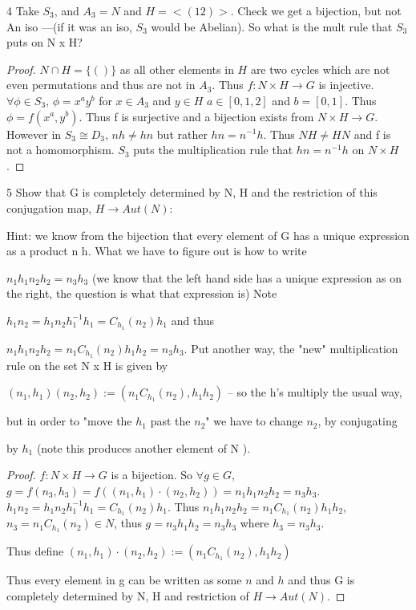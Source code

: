 \documentclass{article}
\begin{document}
\bigskip

\begin{PROB}{4}\label{Problem 4.}
    Take $S_3$, and $A_3 = N$ and $H = <(12)>$. Check we get a bijection, but not An iso —(if it was an iso, $S_3$ would be Abelian). So what is the mult rule that $S_3$ puts on N x H?
\end{PROB}
\begin{proof}
    $N \cap H = \{()\}$ as all other elements in $H$ are two cycles which are not even permutations and thus are not in $A_3$. Thus $f: N \times H \to G$ is injective. $\forall \phi \in S_3$, $\phi = x^ay^b$ for $x \in A_3$ and $y \in H$ $a \in [0, 1, 2]$ and $b = [0, 1]$. Thus $\phi = f(x^a, y^b)$. Thus f is surjective and a bijection 
    exists from $N \times H \to G$. However in $S_3 \cong D_3$, $nh \neq hn$ but rather $hn = n^{-1}h$. Thus $NH \neq HN$ and f is not a homomorphism. $S_3$ puts the multiplication rule that $hn= n^{-1}h$ on $N \times H$.
\end{proof}

\begin{PROB}{5}\label{Problem 5.}
    Show that G is completely determined by N, H and the restriction of this conjugation map, $H \to Aut(N)$:   
    
    Hint: we know from the bijection that every element of G has a unique expression as a product n h. What we have to figure out is  how to write  
    
    $n_1 h_1  n_2 h_2 = n_3 h_3$ (we know that the left hand side has a unique expression as on the right, the question is what that expression is) Note
    
    $h_1 n_2 = h_1 n_2 h_1^{-1} h_1 = C_{h_1}(n_2) h_1$ and thus 
    
    $n_1 h_1 n_2 h_2 = n_1 C_{h_1}(n_2) h_1 h_2 = n_3 h_3$.  Put another way, the "new" multiplication rule on the set N x H is given by 
    
    $(n_1,h_1)(n_2,h_2) := (n_1 C_{h_1}(n_2),h_1 h_2)$ -- so the h's multiply the usual way,
    
    but in order to "move the $h_1$ past the $n_2$" we have to change $n_2$, by conjugating
    
    by $h_1$ (note this produces another element of N ).  
\end{PROB}
\begin{proof}
    $f: N \times H \to G$ is a bijection. So $\forall g \in G$, $g = f(n_3, h_3) = f((n_1, h_1) \cdot (n_2, h_2)) = n_1h_1n_2h_2 = n_3h_3$. $h_1n_2 = h_1n_2h_1^{-1}h_1 = C_{h_1}(n_2)h_1$. Thus $n_1h_1n_2h_2 = n_1C_{h_1}(n_2)h_1h_2$, $n_3 = n_1C_{h_1}(n_2) \in N$, thus $g = n_3h_1h_2 = n_3h_3$ where $h_3 = n_3h_3$. 

    Thus define $(n_1, h_1) \cdot (n_2, h_2) := (n_1C_{h_1}(n_2), h_1h_2)$

    Thus every element in g can be written as some $n$ and $h$ and thus G is completely determined by N, H and restriction of $H \to Aut(N)$.
\end{proof}
\end{document}
